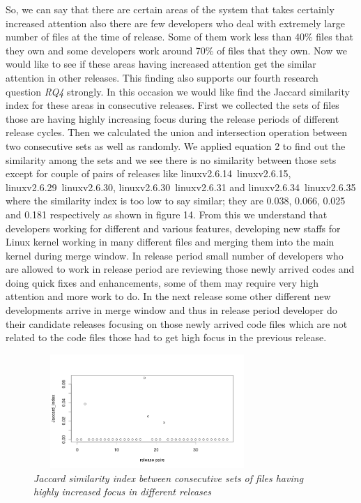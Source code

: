 \documentclass{acm_proc_article-sp}
\begin{document}
So, we can say that there are certain areas of the system that takes certainly increased attention also there are few developers who deal with extremely large number of files at the time of release. Some of them work less than 40\% files that they own and some developers work around 70\% of files that they own. Now we would like to see if these areas having increased attention get the similar attention in other releases. This finding also supports our fourth research question \textit{RQ4} strongly. In this occasion we would like find the Jaccard similarity index for these areas in consecutive releases. First we collected the sets of files those are having highly increasing focus during the release periods of different release cycles. Then we calculated the union and intersection operation between two consecutive sets as well as randomly. We applied equation 2 to find out the similarity among the sets and we see there is no similarity between those sets except for couple of pairs of releases like linuxv2.6.14~linuxv2.6.15, linuxv2.6.29~linuxv2.6.30, linuxv2.6.30~linuxv2.6.31 and linuxv2.6.34~linuxv2.6.35 where the similarity index is too low to say similar; they are 0.038, 0.066, 0.025 and 0.181 respectively as shown in figure 14. From this we understand that developers working for different and various features, developing new staffs for Linux kernel working in many different files and merging them into the main kernel during merge window. In release period small number of developers who are allowed to work in release period are reviewing those newly arrived codes and doing quick fixes and enhancements, some of them may require very high attention and more work to do. In the next release some other different new developments arrive in merge window and thus in release period developer do their candidate releases focusing on those newly arrived code files which are not related to the code files those had to get high focus in the previous release.

\begin{figure}
\begin{center}
\includegraphics[height=1.7in,width=3.4in]{jdRPHighFocusFiles.png}
\caption{\small \sl Jaccard similarity index between consecutive sets of files having highly increased focus in different releases}
\end{center}

\end{figure}
\end{document}
